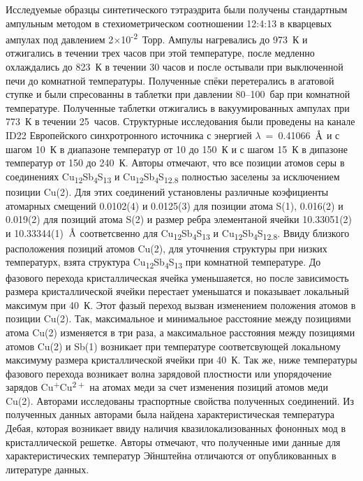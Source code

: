 Исследуемые образцы синтетического тэтраэдрита были получены стандартным ампульным методом в стехиометрическом соотношении 12:4:13 в кварцевых ампулах под давлением 2$\times$10\textsuperscript{-2}~Торр. Ампулы нагревались до 973~К и отжигались в течении трех часов при этой температуре, после медленно охлаждались до 823~К в течении 30 часов и после остывали при выключенной печи до комнатной температуры. Полученные спёки перетерались в агатовой ступке и были спресованны в таблетки при давлении 80--100~бар при комнатной температуре. Полученные таблетки отжигались в вакуумированных ампулах при 773~К в течении 25~часов. Структурные исследования были проведены на канале ID22 Европейского синхротронного источника с энергией $\lambda$~=~0.41066~$\mbox{\normalfont\AA}$ и с шагом 10~К в диапазоне температур от 10 до 150~К и с шагом 15~К в дипазоне температур от 150 до 240~К. Авторы отмечают, что все позиции атомов серы в соединениях Cu\textsubscript{12}Sb\textsubscript{4}S\textsubscript{13} и Cu\textsubscript{12}Sb\textsubscript{4}S\textsubscript{12.8} полностью заселены за исключением позиции Cu(2). Для этих соединений установлены различные коэфициенты атомарных смещений 0.0102(4) и 0.0125(3) для позиции атома S(1), 0.016(2) и 0.019(2) для позиций атома S(2) и размер ребра элементаной ячейки 10.33051(2) и 10.33344(1)~$\mbox{\normalfont\AA}$ соответсвенно для Cu\textsubscript{12}Sb\textsubscript{4}S\textsubscript{13} и Cu\textsubscript{12}Sb\textsubscript{4}S\textsubscript{12.8}. Ввиду близкого расположения позиций атомов Cu(2), для уточнения структуры при низких температурх, взята структура Cu\textsubscript{12}Sb\textsubscript{4}S\textsubscript{13}  при комнатной температуре. До фазового перехода кристаллическая ячейка уменьшаяется, но после зависимость размера кристаллической ячейки перестает уменьшатся и показывает локальный максимум при 40~К. Этот фазый переход вызван изменением положения атомов в позиции Cu(2). Так, максимальное и минимальное расстояние между позициями атома Cu(2) изменяется в три раза, а максимальное расстояния между позициями атомов Cu(2) и Sb(1) возникает при температуре соответсвующей локальному максимуму размера кристаллической ячейки при 40~К. Так же, ниже температуры фазового перехода возникает волна зарядовой плостности или упорядочение зарядов Cu\textsuperscript{$+$}Cu\textsuperscript{$2+$} на атомах меди за счет изменения позиций атомов меди Cu(2). Авторами исследованы траспортные свойства полученных соединений. Из полученных данных авторами была найдена характеристическая температура Дебая, которая возникает ввиду наличия квазилокализованных фононных мод в кристаллической решетке. Авторы отмечают, что полученные ими данные для характеристических температур Эйнштейна отличаются от опубликованных в литературе данных\cite{Lara-Curzio2014}. 

